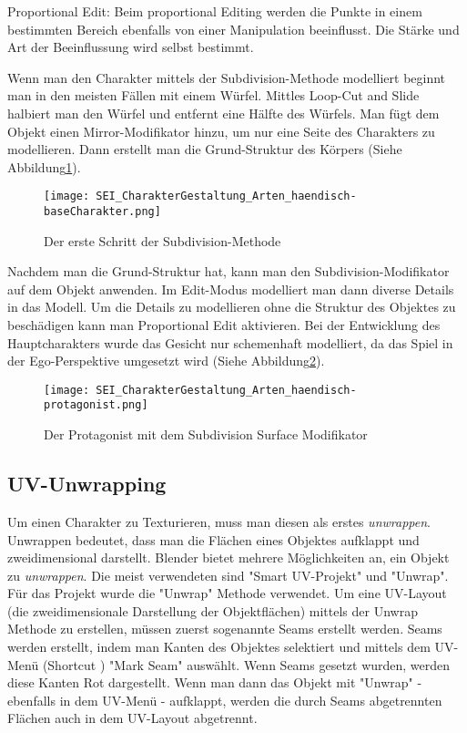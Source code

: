 Proportional Edit\citep{blender:prop_editing}:
Beim proportional Editing werden die Punkte in einem bestimmten Bereich ebenfalls von einer Manipulation beeinflusst.
Die Stärke und Art der Beeinflussung wird selbst bestimmt.


Wenn man den Charakter mittels der Subdivision-Methode modelliert beginnt man in den meisten Fällen mit einem Würfel.
Mittles Loop-Cut and Slide halbiert man den Würfel und entfernt eine Hälfte des Würfels. Man fügt dem Objekt einen
Mirror-Modifikator hinzu, um nur eine Seite des Charakters zu modellieren. Dann erstellt man die Grund-Struktur des
Körpers (Siehe Abbildung\ref{picture:base_body}).

\begin{figure}[H]
    \centering
    \texttt{[image: SEI\_CharakterGestaltung\_Arten\_haendisch-baseCharakter.png]}
    \caption{Der erste Schritt der Subdivision-Methode}
    \label{picture:base_body}
\end{figure}

Nachdem man die Grund-Struktur hat, kann man den Subdivision-Modifikator auf dem Objekt anwenden. Im Edit-Modus
modelliert man dann diverse Details in das Modell. Um die Details zu modellieren ohne die Struktur des Objektes
zu beschädigen kann man Proportional Edit aktivieren. Bei der Entwicklung des Hauptcharakters wurde das Gesicht
nur schemenhaft modelliert, da das Spiel in der Ego-Perspektive umgesetzt wird (Siehe Abbildung\ref{picture:protagonist}).

\begin{figure}[H]
    \centering
    \texttt{[image: SEI\_CharakterGestaltung\_Arten\_haendisch-protagonist.png]}
    \caption{Der Protagonist mit dem Subdivision Surface Modifikator}
    \label{picture:protagonist}
\end{figure}


\subsection{UV-Unwrapping}
\label{sec:unwrapping}

Um einen Charakter zu Texturieren, muss man diesen als erstes \textit{unwrappen}. Unwrappen bedeutet, dass man die Flächen
eines Objektes aufklappt und zweidimensional darstellt. Blender bietet mehrere Möglichkeiten an, ein Objekt zu
\textit{unwrappen}. Die meist verwendeten sind "Smart UV-Projekt"\citep{blender:smart_uv} und
"Unwrap"\citep{blender:unwrap}. Für das Projekt wurde die "Unwrap" Methode verwendet. Um eine UV-Layout
(die zweidimensionale Darstellung der Objektflächen) mittels der Unwrap Methode zu erstellen, müssen zuerst sogenannte
Seams erstellt werden\citep{blender:seams}. Seams werden erstellt, indem man Kanten des Objektes selektiert und mittels
dem UV-Menü (Shortcut ) "Mark Seam" auswählt. Wenn Seams gesetzt wurden, werden diese Kanten Rot dargestellt.
Wenn man dann das Objekt mit "Unwrap" - ebenfalls in dem UV-Menü - aufklappt, werden die durch Seams abgetrennten
Flächen auch in dem UV-Layout abgetrennt.


